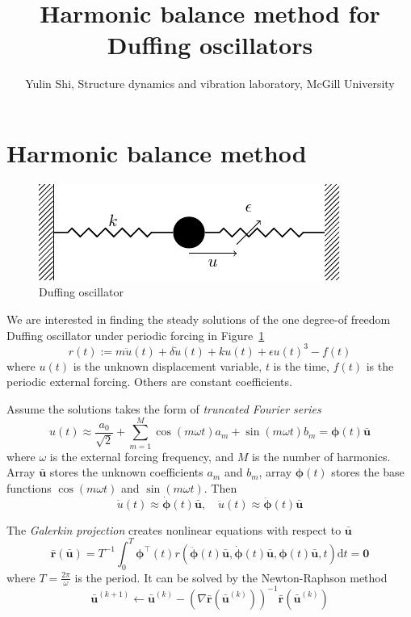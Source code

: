 \documentclass[10pt,letterpaper]{article}
\author{Yulin Shi, Structure dynamics and vibration laboratory, McGill University}
\title{Harmonic balance method for Duffing oscillators}
\begin{document}
\maketitle
\section{Harmonic balance method}
\begin{figure}[ht!]
	\centering
	\includegraphics[scale=1]{figure/duff_one_dof/tikz}
	\caption{Duffing oscillator}
	\label{fig:duff_one_dof}
\end{figure}
We are interested in finding the steady solutions of the one degree-of freedom Duffing oscillator under periodic forcing in Figure~\ref{fig:duff_one_dof}
\begin{equation}
	r(t):=m\ddot{u}(t) + \delta \dot{u}(t) + ku(t) + \epsilon u(t)^3 - f(t)
\end{equation}
where $u(t)$ is the unknown displacement variable, $t$ is the time, $f(t)$ is the periodic external forcing. Others are constant coefficients. 

Assume the solutions takes the form of \emph{truncated Fourier series}
\begin{equation}\label{eq:undetermined_coefficients_solution}
	u(t) \approx \frac{a_0}{\sqrt{2}} +\sum_{m=1}^M \cos(m\omega t)a_m+\sin(m\omega t)b_m =\boldsymbol{\phi}(t) \bar{\mathbf u}
\end{equation}
where $\omega$ is the external forcing frequency, and $M$ is the number of harmonics. Array $\bar{\mathbf u}$ stores the unknown coefficients $a_m$ and $b_m$, array $\boldsymbol\phi(t)$ stores the base functions $\cos(m\omega t)$ and $\sin(m\omega t)$. 
Then 
\begin{equation}
	\dot{u}(t) \approx \dot{\boldsymbol{\phi}}(t) \bar{\mathbf u}
,\quad	\ddot{u}(t) \approx \ddot{\boldsymbol{\phi}}(t) \bar{\mathbf u}
\end{equation}

The \emph{Galerkin projection} creates nonlinear equations with respect to $\bar{\mathbf u}$ 
\begin{equation}\label{eq:galerkin_projection}
	\bar{\mathbf r}(\bar{\mathbf u})
	=T^{-1}\int_0^T \boldsymbol\phi^\top (t) r(\ddot{\boldsymbol\phi}(t) \bar{\mathbf u}, \dot{\boldsymbol\phi}(t) \bar{\mathbf u},\boldsymbol\phi(t) \bar{\mathbf u},t) \mathrm dt=\mathbf 0
\end{equation}
where $T=\frac{2\pi}{\omega}$ is the period. It can be solved by the Newton-Raphson method
\begin{equation}
	\bar{\mathbf u}^{(k+1)} \leftarrow \bar{\mathbf u}^{(k)} -(\nabla \bar{\mathbf r}(\bar{\mathbf u}^{(k)}))^{-1} \bar{\mathbf r}(\bar{\mathbf u}^{(k)})
\end{equation}
\end{document}
